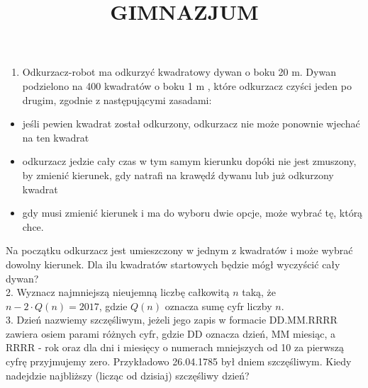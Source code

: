 \documentclass[10pt]{article}
\title{GIMNAZJUM }
\author{}
\date{}
\begin{document}
\maketitle
\begin{enumerate}
  \item Odkurzacz-robot ma odkurzyć kwadratowy dywan o boku 20 m. Dywan podzielono na 400 kwadratów o boku 1 m , które odkurzacz czyści jeden po drugim, zgodnie z następującymi zasadami:
\end{enumerate}

\begin{itemize}
  \item jeśli pewien kwadrat został odkurzony, odkurzacz nie może ponownie wjechać na ten kwadrat
  \item odkurzacz jedzie cały czas w tym samym kierunku dopóki nie jest zmuszony, by zmienić kierunek, gdy natrafi na krawędź dywanu lub już odkurzony kwadrat
  \item gdy musi zmienić kierunek i ma do wyboru dwie opcje, może wybrać tę, którą chce.
\end{itemize}

Na początku odkurzacz jest umieszczony w jednym z kwadratów i może wybrać dowolny kierunek. Dla ilu kwadratów startowych będzie mógł wyczyścić cały dywan?\\
2. Wyznacz najmniejszą nieujemną liczbę całkowitą \(n\) taką, że \(n-2 \cdot Q(n)=2017\), gdzie \(Q(n)\) oznacza sumę cyfr liczby \(n\).\\
3. Dzień nazwiemy szczęśliwym, jeżeli jego zapis w formacie DD.MM.RRRR zawiera osiem parami różnych cyfr, gdzie DD oznacza dzień, MM miesiąc, a RRRR - rok oraz dla dni i miesięcy o numerach mniejszych od 10 za pierwszą cyfrę przyjmujemy zero. Przykładowo 26.04.1785 był dniem szczęśliwym. Kiedy nadejdzie najbliższy (licząc od dzisiaj) szczęśliwy dzień?
\end{document}
